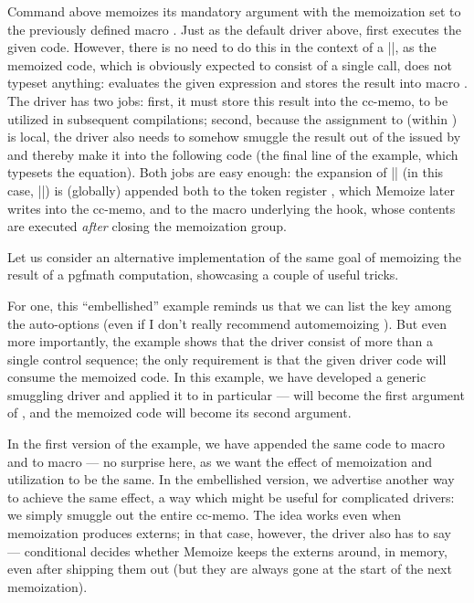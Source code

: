 \documentclass[a4paper,11pt]{article}
\begin{document}
Command  above memoizes its mandatory argument with the memoization
 set to the previously defined macro .
Just as the default driver above,  first executes the
given code.  However, there is no need to do this in the context of a
|\setbox|, as the memoized code, which is obviously expected to consist of a
single  call, does not typeset anything: 
evaluates the given expression and stores the result into macro
.  The driver has two jobs: first, it must store this result
into the cc-memo, to be utilized in subsequent compilations; second, because
the assignment to  (within ) is local, the
driver also needs to somehow smuggle the result out of the  issued
by  and thereby make it into the following code (the final line
of the example, which typesets the equation).  Both jobs are easy enough: the
expansion of |\def\noexpand\pgfmathresult{\pgfmathresult}| (in this case,
|\def\pgfmathresult{42.0}|) is (globally) appended both to the token register
, which Memoize later writes into the cc-memo, and to the
macro underlying the  hook, whose contents are
executed \emph{after} closing the memoization group.

Let us consider an alternative implementation of the same goal of memoizing the
result of a pgfmath computation, showcasing a couple of useful tricks.


For one, this ``embellished'' example reminds us that we can list the
 key among the auto-options (even if I don't really recommend
automemoizing ).  But even more importantly, the example shows
that the driver consist of more than a single control sequence; the only
requirement is that the given driver code will consume the memoized code.  In
this example, we have developed a generic smuggling driver and applied it to
 in particular ---  will become the first
argument of , and the memoized code will become its
second argument.

In the first version of the example, we have appended the same code to macro
 and to macro  --- no
surprise here, as we want the effect of memoization and utilization to be the
same.  In the embellished version, we advertise another way to achieve the same
effect, a way which might be useful for complicated drivers: we simply smuggle
out the entire cc-memo.  The idea works even when memoization produces externs;
in that case, however, the driver also has to say  ---
conditional  decides whether Memoize keeps the externs
around, in memory, even after shipping them out (but they are always gone at
the start of the next memoization).
\end{document}
